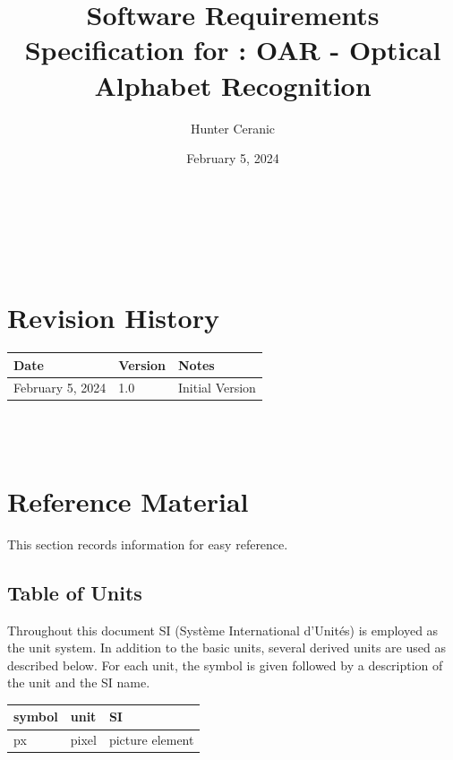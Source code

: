 \documentclass[12pt]{article}
\begin{document}
\title{Software Requirements Specification for \progname: OAR - Optical Alphabet Recognition} 
\author{Hunter Ceranic}
\date{February 5, 2024}
	
\maketitle

~\newpage


\tableofcontents

~\newpage

\section*{Revision History}

\begin{tabularx}{\textwidth}{p{3cm}p{2cm}X}
\toprule {\bf Date} & {\bf Version} & {\bf Notes}\\
\midrule
February 5, 2024 & 1.0 & Initial Version\\
\bottomrule
\end{tabularx}

~\\

~\newpage

\section{Reference Material}

This section records information for easy reference.

\subsection{Table of Units}

Throughout this document SI (Syst\`{e}me International d'Unit\'{e}s) is employed
as the unit system.  In addition to the basic units, several derived units are
used as described below.  For each unit, the symbol is given followed by a
description of the unit and the SI name.
~\newline

\renewcommand{\arraystretch}{1.2}
  \noindent \begin{tabular}{l l l} 
    \toprule		
    \textbf{symbol} & \textbf{unit} & \textbf{SI}\\
    \midrule 
    px & pixel & picture element\\
  \end{tabular}
\end{document}
